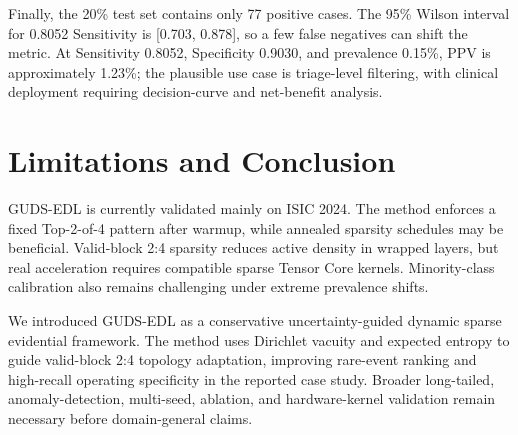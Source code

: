\documentclass[letterpaper]{article} %
\begin{document}
Finally, the 20\% test set contains only 77 positive cases. The 95\% Wilson interval for 0.8052 Sensitivity is [0.703, 0.878], so a few false negatives can shift the metric. At Sensitivity 0.8052, Specificity 0.9030, and prevalence 0.15\%, PPV is approximately 1.23\%; the plausible use case is triage-level filtering, with clinical deployment requiring decision-curve and net-benefit analysis.

\section{Limitations and Conclusion}
GUDS-EDL is currently validated mainly on ISIC 2024. The method enforces a fixed Top-2-of-4 pattern after warmup, while annealed sparsity schedules may be beneficial. Valid-block 2:4 sparsity reduces active density in wrapped layers, but real acceleration requires compatible sparse Tensor Core kernels. Minority-class calibration also remains challenging under extreme prevalence shifts.

We introduced GUDS-EDL as a conservative uncertainty-guided dynamic sparse evidential framework. The method uses Dirichlet vacuity and expected entropy to guide valid-block 2:4 topology adaptation, improving rare-event ranking and high-recall operating specificity in the reported case study. Broader long-tailed, anomaly-detection, multi-seed, ablation, and hardware-kernel validation remain necessary before domain-general claims.
\end{document}
